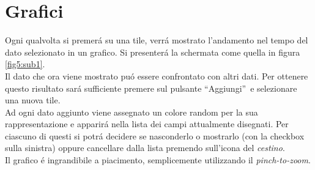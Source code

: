 \documentclass{article}
\newcommand{\quotes}[1]{``#1''}
\begin{document}
    \section{Grafici}
    Ogni qualvolta si premerá su una tile, verrá mostrato l'andamento nel tempo del dato selezionato in un grafico.
    Si presenterá la schermata come quella in figura \ref{fig5:sub1}.
    \\
    Il dato che ora viene mostrato puó essere confrontato con altri dati. Per ottenere questo risultato sará sufficiente premere sul pulsante \quotes{Aggiungi} e selezionare una nuova tile.
    \\
    Ad ogni dato aggiunto viene assegnato un colore random per la sua rappresentazione e apparirá nella lista dei campi attualmente disegnati. 
    Per ciascuno di questi si potrá decidere se nasconderlo o mostrarlo (con la checkbox sulla sinistra) oppure cancellare dalla lista premendo sull'icona del \emph{cestino}.
    \\
    Il grafico é ingrandibile a piacimento, semplicemente utilizzando il \emph{pinch-to-zoom}.
\end{document}
